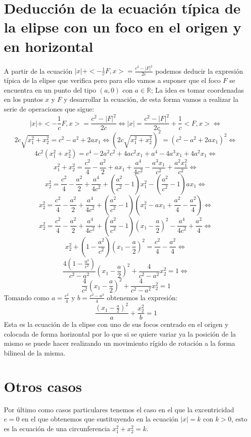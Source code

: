 \documentclass[a4paper, 11pt]{article} %
\begin{document}
	\section{Deducción de la ecuación típica de la elipse con un foco en el origen y en horizontal}
	A partir de la ecuación $|x|+<-\frac{1}{c}F,x> = \frac{c^2-|F|^2}{2c}$ podemos deducir la expresión típica de la elipse que verifica pero para ello vamos a suponer que el foco $F$ se encuentra en un punto del tipo $(a, 0)$ con $a\in \mathbb{R}$; La idea es tomar coordenadas en los puntos $x$ y $F$ y desarrollar la ecuación, de esta forma vamos a realizar la serie de operaciones que sigue:
	$$|x|+<-\frac{1}{c}F,x> = \frac{c^2-|F|^2}{2c} \Leftrightarrow |x| = \frac{c^2-|F|^2}{2c}+\frac{1}{c}<F,x> \Leftrightarrow$$
	$$2c\sqrt{x_1^2+x_2^2} = c^2-a^2+2ax_1 \Leftrightarrow (2c\sqrt{x_1^2+x_2^2})^2 = (c^2-a^2+2ax_1)^2 \Leftrightarrow$$
	$$4c^2(x_1^2+x_2^2)=c^4-2a^2c^2+4ac^2x_1+a^4-4a^3x_1+4a^2x_1 \Leftrightarrow$$
	$$x_1^2+x_2^2=\frac{c^2}{4}-\frac{a^2}{2}+ax_1+\frac{a^4}{4c^2}-\frac{a^3x_1}{c^2}+\frac{a^2x_1^2}{c^2} \Leftrightarrow$$
	$$x_2^2 = \frac{c^2}{4}-\frac{a^2}{2}+\frac{a^4}{4c^2}+(\frac{a^2}{c^2}-1)x_1^2 -(\frac{a^2}{c^2}-1)ax_1 \Leftrightarrow$$
	$$x_2^2 = \frac{c^2}{4}-\frac{a^2}{2}+\frac{a^4}{4c^2}+(\frac{a^2}{c^2}-1)(x_1^2 -ax_1+\frac{a^2}{4}-\frac{a^2}{4}) \Leftrightarrow$$
	$$x_2^2 = \frac{c^2}{4}-\frac{a^2}{2}+\frac{a^4}{4c^2}+(\frac{a^2}{c^2}-1)(x_1-\frac{a}{2})^2-\frac{a^4}{4c^2}+\frac{a^2}{4} \Leftrightarrow$$
	$$x_2^2+(1-\frac{a^2}{c^2})(x_1-\frac{a}{2})^2=\frac{c^2}{4}-\frac{a^2}{4} \Leftrightarrow$$
	$$\frac{4(1-\frac{a^2}{c^2})}{c^2-a^2}(x_1-\frac{a}{2})^2+\frac{4}{c^2-a^2}x_2^2=1 \Leftrightarrow$$
	$$\frac{4}{c^2}(x_1-\frac{a}{2})^2+\frac{4}{c^2-a^2}x_2^2=1$$
	Tomando como $a = \frac{c^2}{4}$ y $b = \frac{c^2-a^2}{4}$ obtenemos la expresión:
	$$\frac{(x_1-\frac{a}{2})^2}{a}+\frac{x_2^2}{b}=1$$
	Esta es la ecuación de la elipse con uno de sus focos centrado en el origen y colocada de forma horizontal por lo que si se quiere variar ya la posición de la mismo se puede hacer realizando un movimiento rígido de rotación a la forma bilineal de la misma.
	\section{Otros casos}
	Por último como casos particulares tenemos el caso en el que la excentricidad $e = 0$ en el que obtenemos que sustituyendo en la ecuación $|x|=k$ con $k >0$, esto es la ecuación de una circunferencia $x_1^2+x_2^2=k$.
	
\end{document}
